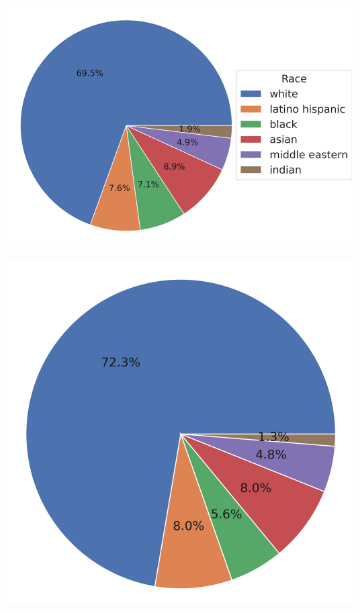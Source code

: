 \documentclass{article}
\begin{document}
\begin{figure}
\begin{subfigure}{0.285\textwidth}
    \includegraphics[width=\linewidth]{figs/plots/data-0-0_race.png}
  \end{subfigure}\hfill 
  \begin{subfigure}{0.235\textwidth}
  \centering
    \includegraphics[width=0.8\linewidth]{figs/plots/standard_sampler-1000-1000_race.png} 
  \end{subfigure}\hfill 
  \begin{subfigure}{0.235\textwidth}
  \centering

\end{subfigure}
\end{figure}
\end{document}
